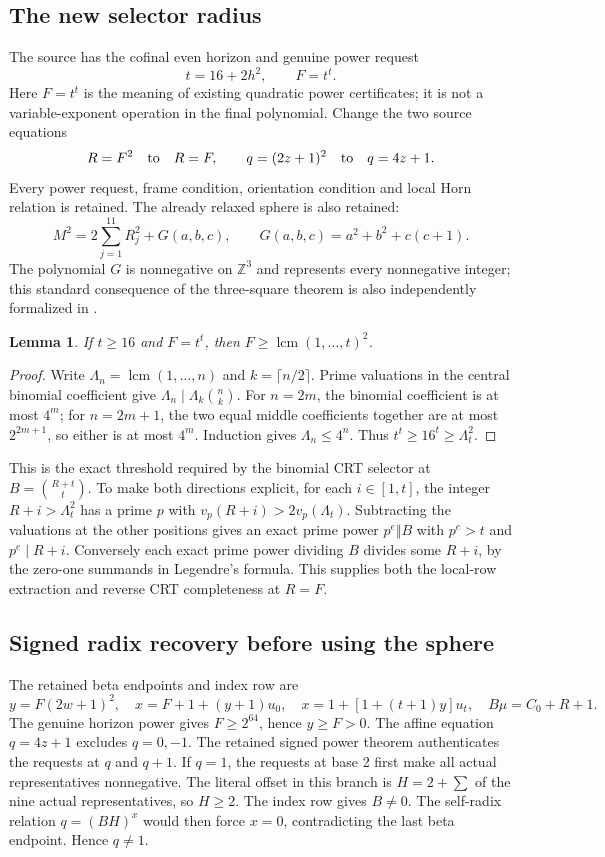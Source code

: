 \documentclass[10pt,letterpaper]{article}
\newcommand{\Z}{\mathbb Z}
\newcommand{\lcm}{\operatorname{lcm}}
\newtheorem{lemma}[theorem]{Lemma}
\theoremstyle{remark}\newtheorem{remark}[theorem]{Remark}
\begin{document}
\subsection{The new selector radius}

The source has the cofinal even horizon and genuine power request
\[
 t=16+2h^2,\qquad F=t^t.
\]
Here $F=t^t$ is the meaning of existing quadratic power certificates;
it is not a variable-exponent operation in the final polynomial.
Change the two source equations
\[
 R=F^2\quad\hbox{to}\quad R=F,
 \qquad q=(2z+1)^2\quad\hbox{to}\quad q=4z+1.
\]
Every power request, frame condition, orientation condition and local
Horn relation is retained. The already relaxed sphere is also retained:
\[
 M^2=2\sum_{j=1}^{11}R_j^2+G(a,b,c),\qquad
 G(a,b,c)=a^2+b^2+c(c+1).
\]
The polynomial $G$ is nonnegative on $\Z^3$ and represents every
nonnegative integer; this standard consequence of the three-square theorem
is also independently formalized in \cite{threesquares}.

\begin{lemma}
If $t\ge16$ and $F=t^t$, then
$F\ge\lcm(1,\ldots,t)^2$.
\end{lemma}
\begin{proof}
Write $\Lambda_n=\lcm(1,\ldots,n)$ and $k=\lceil n/2\rceil$.
Prime valuations in the central binomial coefficient give
$\Lambda_n\mid\Lambda_k\binom nk$.
For $n=2m$, the binomial coefficient is at most $4^m$;
for $n=2m+1$, the two equal middle coefficients together are at most
$2^{2m+1}$, so either is at most $4^m$.
Induction gives $\Lambda_n\le4^n$. Thus
$t^t\ge16^t\ge\Lambda_t^2$.
\end{proof}

This is the exact threshold required by the binomial CRT selector at
$B=\binom{R+t}{t}$. To make both directions explicit, for each
$i\in[1,t]$, the integer $R+i>\Lambda_t^2$ has a prime $p$ with
$v_p(R+i)>2v_p(\Lambda_t)$. Subtracting the valuations at the other
positions gives an exact prime power $p^e\Vert B$ with $p^e>t$ and
$p^e\mid R+i$. Conversely each exact prime power dividing $B$ divides
some $R+i$, by the zero-one summands in Legendre's formula. This supplies
both the local-row extraction and reverse CRT completeness at $R=F$.

\subsection{Signed radix recovery before using the sphere}

The retained beta endpoints and index row are
\[
 y=F(2w+1)^2,\quad x=F+1+(y+1)u_0,\quad
 x=1+[1+(t+1)y]u_t,\quad B\mu=C_0+R+1.
\]
The genuine horizon power gives $F\ge2^{64}$, hence $y\ge F>0$.
The affine equation $q=4z+1$ excludes $q=0,-1$. The retained signed
power theorem authenticates the requests at $q$ and $q+1$. If $q=1$,
the requests at base 2 first make all actual representatives nonnegative.
The literal offset in this branch is
$H=2+\sum$ of the nine actual representatives, so $H\ge2$.
The index row gives $B\ne0$. The self-radix relation $q=(BH)^x$ would
then force $x=0$, contradicting the last beta endpoint. Hence $q\ne1$.
\end{document}
